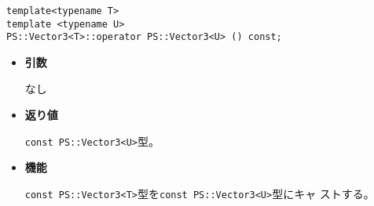 \mbox{}

\begin{screen}
\begin{verbatim}
template<typename T>
template <typename U>
PS::Vector3<T>::operator PS::Vector3<U> () const;
\end{verbatim}
\end{screen}

\begin{itemize}

\item{{\bf 引数}}

  なし

\item{{\bf 返り値}}

  {\tt const PS::Vector3<U>}型。

\item{{\bf 機能}}

  {\tt const PS::Vector3<T>}型を{\tt const PS::Vector3<U>}型にキャ
  ストする。

\end{itemize}
